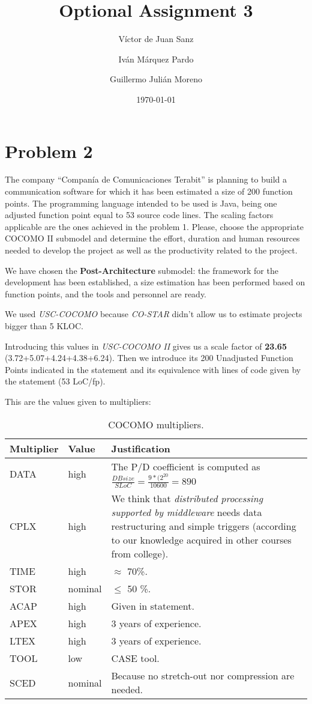 \documentclass{article}
\title{Optional Assignment 3}
\date{\today}
\author{V\'ictor de Juan Sanz \and Iv\'an M\'arquez Pardo\and Guillermo Juli\'an Moreno}
\newcommand{\seprule}{{\color{gray} \noindent \hspace{40pt} \hrulefill \hspace{40pt} \vspace{13pt}}}
\begin{document}
\maketitle



\newpage
\section{Problem 2}

The company ``Compan\'ia de Comunicaciones Terabit'' is planning to build a communication software for which it has been estimated a size of 200 function points. The programming language intended to be used is Java, being one adjusted function point equal to 53 source code lines. The scaling factors applicable are the ones achieved in the problem 1. Please, choose the appropriate COCOMO II submodel and determine the effort, duration and human resources needed to develop the project as well as the productivity related to the project.

\seprule

We have chosen the \textbf{Post-Architecture} submodel: the framework for the development has been established, a size estimation has been performed based on function points, and the tools and personnel are ready.

We used \textit{USC-COCOMO} because \textit{CO-STAR} didn't allow us to estimate projects bigger than 5 KLOC. 

Introducing this values in \textit{USC-COCOMO II} gives us a scale factor of \textbf{23.65} (3.72+5.07+4.24+4.38+6.24). Then we introduce its 200 Unadjusted Function Points indicated in the statement and its equivalence with lines of code given by the statement (53 LoC/fp).

This are the values given to multipliers:

\begin{table}[hbtp]
\centering
\begin{tabular}{l|l|l}
Multiplier & Value & Justification \\ \hline
DATA & high & The P/D coefficient is computed as $\frac{DB size}{SLoC} = \frac{9*(2^{20}}{10600} = 890$\\ \hline
CPLX & high & We think that \textit{distributed processing supported by middleware} needs data restructuring and simple triggers (according to our knowledge acquired in other courses from college). \\ \hline
TIME & high & $\approx$ 70\%.  \\ \hline
STOR & nominal & $\leq$ 50 \%. \\ \hline
ACAP & high & Given in statement. \\ \hline
APEX & high & 3 years of experience. \\ \hline
LTEX & high & 3 years of experience. \\ \hline
TOOL & low & CASE tool. \\ \hline
SCED & nominal & Because no stretch-out nor compression are needed. \\ \hline
\end{tabular}
\caption{COCOMO multipliers.}
\label{tblMultipliersProblem2}
\end{table}
\end{document}
